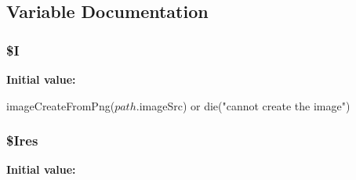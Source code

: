 \subsection{\-Variable \-Documentation}
\hypertarget{test_display_image_8php_a46163db64b57db961d4bb2ada2d923f9}{
\subsubsection[{\$\-I}]{\setlength{\rightskip}{0pt plus 5cm}\$\-I}}
\label{test_display_image_8php_a46163db64b57db961d4bb2ada2d923f9}
{\bfseries \-Initial value\-:}
\begin{DoxyCode}
 imageCreateFromPng($path.$imageSrc) 
                or die("cannot create the image")
\end{DoxyCode}
\hypertarget{test_display_image_8php_a80aa301a4743c402a88f89e1b981775d}{
\subsubsection[{\$\-Ires}]{\setlength{\rightskip}{0pt plus 5cm}\$\-Ires}}
\label{test_display_image_8php_a80aa301a4743c402a88f89e1b981775d}
{\bfseries \-Initial value\-:}
